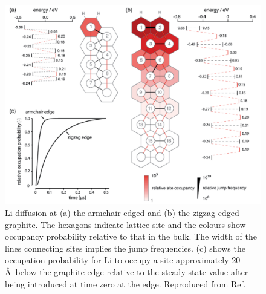 \documentclass[../main.tex]{subfiles}
\begin{document}
\begin{figure}
    \centering
    \includegraphics[scale=0.5]{figures/Graphite_edge_effects.PNG}
    \caption{Li diffusion at (a) the armchair-edged and (b) the zigzag-edged graphite. The hexagons indicate lattice site and the colours show occupancy probability relative to that in the bulk. The width of the lines connecting sites implies the jump frequencies. (c) shows the occupation probability for Li to occupy a site approximately 20 \AA \ below the graphite edge relative to the steady-state value after being introduced at time zero at the edge. Reproduced from Ref.}
    \label{fig:Li_diffusion_edge}
\end{figure}
\end{document}
